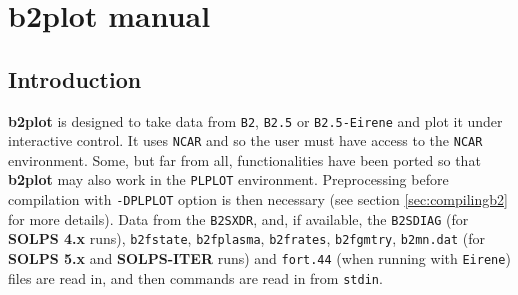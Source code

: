 \documentclass[a4paper,10pt]{report}
\newcommand\SOLPSfour{{\bf SOLPS 4.x} }
\newcommand\SOLPSfive{{\bf SOLPS 5.x} }
\newcommand\SOLPSITER{{\bf SOLPS-ITER} }
\newcommand{\btwoplot}{{\bf b2plot} }
\begin{document}
\clearpage

\chapter{b2plot manual}
\label{cha:b2plotmanual}

\section{Introduction}

\btwoplot is designed to take data from {\tt B2}, {\tt B2.5} or {\tt B2.5-Eirene} and plot it
under interactive control.  It uses {\tt NCAR} and so the user must have
access to the {\tt NCAR} environment. Some, but far from all, functionalities
have been ported so that \btwoplot may also work in the {\tt PLPLOT}
environment. Preprocessing before compilation with {\tt -DPLPLOT} option is then necessary
(see section \ref{sec:compilingb2} for more details).
Data from the {\tt B2SXDR}, and, if available, the {\tt B2SDIAG} (for \SOLPSfour runs),
{\tt b2fstate}, {\tt b2fplasma}, {\tt b2frates}, {\tt b2fgmtry}, {\tt b2mn.dat}
(for \SOLPSfive and \SOLPSITER runs) and {\tt fort.44} (when running
with {\tt Eirene}) files are read in, and then
commands are read in from {\tt stdin}.
\end{document}
